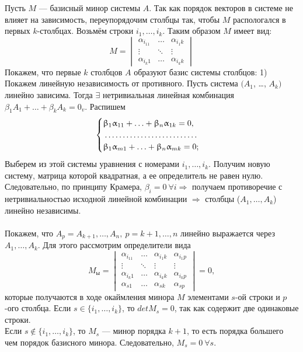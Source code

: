 \begin{Proof} Пусть $M$ --- базисный минор системы $A$. Так как порядок векторов в системе не влияет на зависимость, переупорядочим столбцы так, чтобы $M$ распологался в первых $k$-столбцах. Возьмём строки $i_1,\dots,i_k$. Таким образом $M$ имеет вид:\\
	$$M=\begin{vmatrix}
		\alpha_{i_11} & \dots & \alpha_{i_1k}
		\\ \vdots & \ddots & \vdots
		\\ \alpha_{i_k1} & \dots & \alpha_{i_kk}
	\end{vmatrix}$$ Покажем, что первые $k$ столбцов $A$ образуют базис системы столбцов: 1) Покажем линейную независимость от противного. Пусть система $(A_{1}$, \dots, $A_{k})$ линейно зависима. Тогда $\exists$  нетривиальная линейная комбинация $\beta_1 A_1 + \ldots + \beta_k A_k = 0_v$. Распишем
	$$\begin{cases}
		\beta_{1}\alpha_{11} + \ldots + \beta_{n}\alpha_{1k} = 0,
		\\ \dotfill
		\\ \beta_{1}\alpha_{m1} + \ldots + \beta_{n}\alpha_{mk} = 0;
	\end{cases}$$
	Выберем из этой системы уравнения с номерами $i_1,\dots,i_k$. Получим новую систему, матрица которой квадратная, а ее определитель не равен нулю. Следовательно, по принципу Крамера, $\beta_i = 0\ \forall i \Rightarrow$ получаем противоречие с нетривиальностью исходной линейной комбинации $\Rightarrow$ столбцы ($A_1,\dots,A_k$) линейно независимы.\\\\
	Покажем, что $A_p = A_{k+1},\dots,A_n,\ p = k+1,\dots, n$ линейно выражается через $A_1,\dots,A_k$. Для этого рассмотрим определители вида
	$$M_{ы} = \begin{vmatrix} \alpha_{i_11} & \dots & \alpha_{i_1k} & \alpha_{i_1p}
		\\ \vdots & \ddots & \vdots & \vdots \\ \alpha_{i_k1} & \dots & \alpha_{i_kk} & \alpha_{i_kp}
		\\ \alpha_{s1} & \dots & \alpha_{sk} & \alpha_{sp}
	\end{vmatrix} = 0,$$ которые получаются в ходе окаймления минора $M$ элементами $s$-ой строки и $p$-ого столбца. Если $s\in \{i_1,\dots,i_k\}$, то $detM_s = 0$, так как содержит две одинаковые строки.\\
	Если $s\not\in \{i_1,\dots,i_k\}$, то $M_s$ --- минор порядка $k+1$, то есть порядка большего чем порядок базисного минора. Следовательно, $M_s = 0\ \forall s$.\\\\

\end{Proof}
